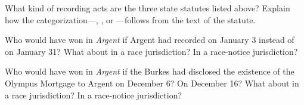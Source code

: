 
\item What kind of recording acts are the three state statutes listed above?
Explain how the categorization---,
, or ---follows from
the text of the statute.


\item Who would have won in \textit{Argent} if Argent had recorded on January 3
instead of on January 31? What about in a race jurisdiction? In a race-notice
jurisdiction?


\item Who would have won in \textit{Argent} if the Burkes had disclosed the
existence of the Olympus Mortgage to Argent on December 6? On December 16? What
about in a race jurisdiction? In a race-notice jurisdiction?

